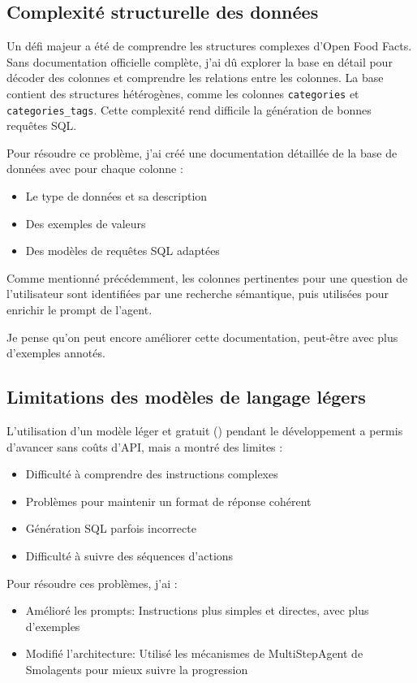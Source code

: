\documentclass[a4paper,11pt]{article}
\begin{document}
\subsection{Complexité structurelle des données}

Un défi majeur a été de comprendre les structures complexes d'Open Food Facts. Sans documentation officielle complète, j'ai dû explorer la base en détail pour décoder des colonnes et 
comprendre les relations entre les colonnes.
La base contient des structures hétérogènes, comme les colonnes \texttt{categories} et \texttt{categories\_tags}. Cette complexité rend difficile la génération de bonnes requêtes SQL.

Pour résoudre ce problème, j'ai créé une documentation détaillée de la base de données 
avec pour chaque colonne :
\begin{itemize}
\item Le type de données et sa description
\item Des exemples de valeurs
\item Des modèles de requêtes SQL adaptées
\end{itemize}

Comme mentionné précédemment, les colonnes pertinentes pour une question de l'utilisateur sont identifiées par une recherche sémantique, puis utilisées pour enrichir le prompt de l'agent. 

\vskip 0.1cm
Je pense qu'on peut encore améliorer cette documentation, peut-être avec plus d'exemples annotés.

\subsection{Limitations des modèles de langage légers}

L'utilisation d'un modèle léger et gratuit () pendant le développement a permis d'avancer sans coûts d'API, mais a montré des limites :
\begin{itemize}
\item Difficulté à comprendre des instructions complexes
\item Problèmes pour maintenir un format de réponse cohérent
\item Génération SQL parfois incorrecte
\item Difficulté à suivre des séquences d'actions
\end{itemize}

\vskip 0.1cm
Pour résoudre ces problèmes, j'ai :
\begin{itemize}
\item Amélioré les prompts: Instructions plus simples et directes, avec plus d'exemples
\item Modifié l'architecture: Utilisé les mécanismes de MultiStepAgent de Smolagents pour mieux suivre la progression
\end{itemize}
\end{document}
